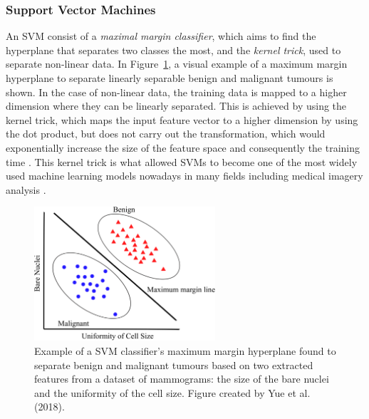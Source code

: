 \subsubsection{Support Vector Machines}

An SVM consist of a \textit{maximal margin classifier}, which aims to find the hyperplane that separates two classes the most, and the \textit{kernel trick}, used to separate non-linear data. In Figure~\ref{fig:litsurvey-svm-example}, a visual example of a maximum margin hyperplane to separate linearly separable benign and malignant tumours is shown. In the case of non-linear data, the training data is mapped to a higher dimension where they can be linearly separated. This is achieved by using the kernel trick, which maps the input feature vector to a higher dimension by using the dot product, but does not carry out the transformation, which would exponentially increase the size of the feature space and consequently the training time \citep{Geron2019}. This kernel trick is what allowed SVMs to become one of the most widely used machine learning models nowadays in many fields including medical imagery analysis \citep{Yue2018}.\\

\begin{figure}[ht]
\centerline{\includegraphics[width=0.6\textwidth]{Dissertation/figures/litsurvey/svm.png}}
\caption{\label{fig:litsurvey-svm-example}Example of a SVM classifier's maximum margin hyperplane found to separate benign and malignant tumours based on two extracted features from a dataset of mammograms: the size of the bare nuclei and the uniformity of the cell size. Figure created by Yue et al. (2018).}
\end{figure}

